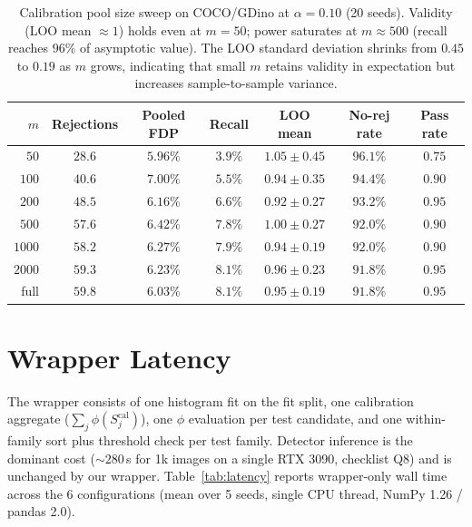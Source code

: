 \documentclass{article}
\theoremstyle{remark}
\newcommand{\1}{\mathbf{1}}
\begin{document}
\begin{table}[h]
\centering
\small
\begin{tabular*}{\linewidth}{@{\extracolsep{\fill}}rcccccc@{}}
\toprule
$m$ & Rejections & Pooled FDP & Recall & LOO mean & No-rej rate & Pass rate \\
\midrule
$50$    & $28.6$ & $5.96\%$ & $3.9\%$ & $1.05 \pm 0.45$ & $96.1\%$ & $0.75$ \\
$100$   & $40.6$ & $7.00\%$ & $5.5\%$ & $0.94 \pm 0.35$ & $94.4\%$ & $0.90$ \\
$200$   & $48.5$ & $6.16\%$ & $6.6\%$ & $0.92 \pm 0.27$ & $93.2\%$ & $0.95$ \\
$500$   & $57.6$ & $6.42\%$ & $7.8\%$ & $1.00 \pm 0.27$ & $92.0\%$ & $0.90$ \\
$1000$  & $58.2$ & $6.27\%$ & $7.9\%$ & $0.94 \pm 0.19$ & $92.0\%$ & $0.90$ \\
$2000$  & $59.3$ & $6.23\%$ & $8.1\%$ & $0.96 \pm 0.23$ & $91.8\%$ & $0.95$ \\
full    & $59.8$ & $6.03\%$ & $8.1\%$ & $0.95 \pm 0.19$ & $91.8\%$ & $0.95$ \\
\bottomrule
\end{tabular*}
\caption{Calibration pool size sweep on COCO/GDino at
$\alpha\!=\!0.10$ (20 seeds). Validity (LOO mean $\approx 1$) holds
even at $m\!=\!50$; power saturates at $m\!\approx\!500$
(recall reaches $96\%$ of asymptotic value). The LOO standard
deviation shrinks from $0.45$ to $0.19$ as $m$ grows, indicating
that small $m$ retains validity in expectation but increases
sample-to-sample variance.}
\label{tab:cal_size}
\end{table}

\section{Wrapper Latency}
\label{app:latency}

The wrapper consists of one histogram fit on the fit split, one
calibration aggregate ($\sum_j \phi(S_j^{\mathrm{cal}})$), one
$\phi$ evaluation per test candidate, and one within-family sort
plus threshold check per test family. Detector inference is the
dominant cost ($\sim\!280$\,s for 1k images on a single RTX 3090,
checklist Q8) and is unchanged by our wrapper.
Table~\ref{tab:latency} reports wrapper-only wall time across the
6 configurations (mean over 5 seeds, single CPU thread,
NumPy 1.26 / pandas 2.0).
\end{document}
